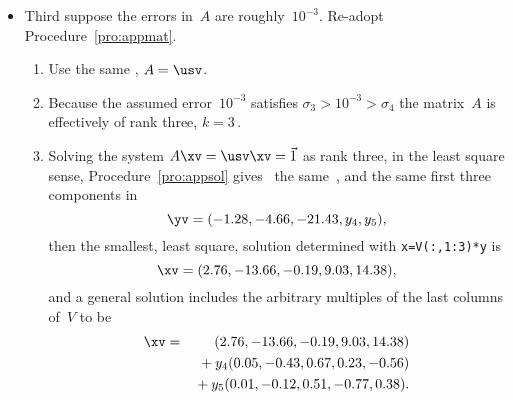 \begin{example}
\begin{solution}
\begin{itemize}
\item Third suppose the errors in~\(A\) are roughly~\(10^{-3}\).
Re-adopt Procedure~\ref{pro:appmat}.
\begin{enumerate}
\item Use the same \svd, \(A=\usv\).
\item Because the assumed error~\(10^{-3}\) satisfies \(\sigma_3>10^{-3}>\sigma_4\) the matrix~\(A\) is effectively of rank three, \(k=3\)\,.
\item Solving the system \(A\xv=\usv\xv=\vec1\) as rank three, in the least square sense, Procedure~\ref{pro:appsol} gives \twodp\ the same~\zv, and the same first three components in
\begin{equation*}
\yv=(-1.28,-4.66,-21.43,y_4,y_5),
\end{equation*}
then the smallest, least square, solution determined with 
\verb|x=V(:,1:3)*y| is
\begin{equation*}
\xv=(2.76,-13.66,-0.19,9.03,14.38),
\end{equation*}
and a general solution includes the arbitrary multiples of the last columns of~\(V\) to be
\begin{eqnarray*}
\xv&=&(2.76,-13.66,-0.19,9.03,14.38)
\\&&{}+y_4(0.05,-0.43,0.67,0.23,-0.56)
\\&&{}+y_5(0.01,-0.12,0.51,-0.77,0.38).
\end{eqnarray*}
\end{enumerate}


\end{itemize}
\end{solution}
\end{example}
